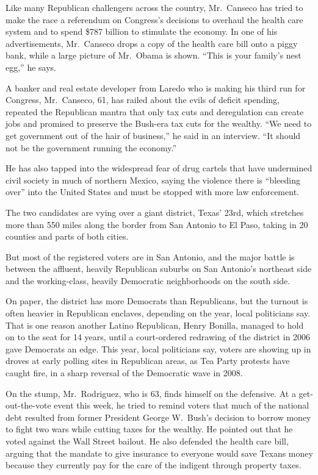 ﻿\documentclass[12pt]{article}
\begin{document}
Like many Republican challengers across the country, Mr.~Canseco has tried to make the race a
referendum on Congress's decisions to overhaul the health care system and to spend \$787 billion to
stimulate the economy. In one of his advertisements, Mr.~Canseco drops a copy of the health care
bill onto a piggy bank, while a large picture of Mr.~Obama is shown. ``This is your family's nest
egg,'' he says.

A banker and real estate developer from Laredo who is making his third run for Congress,
Mr.~Canseco, 61, has railed about the evils of deficit spending, repeated the Republican mantra that
only tax cuts and deregulation can create jobs and promised to preserve the Bush-era tax cuts for
the wealthy. ``We need to get government out of the hair of business,'' he said in an interview.
``It should not be the government running the economy.''

He has also tapped into the widespread fear of drug cartels that have undermined civil society in
much of northern Mexico, saying the violence there is ``bleeding over'' into the United States and
must be stopped with more law enforcement.

The two candidates are vying over a giant district, Texas' 23rd, which stretches more than 550 miles
along the border from San Antonio to El Paso, taking in 20 counties and parts of both cities.

But most of the registered voters are in San Antonio, and the major battle is between the affluent,
heavily Republican suburbs on San Antonio's northeast side and the working-class, heavily Democratic
neighborhoods on the south side.

On paper, the district has more Democrats than Republicans, but the turnout is often heavier in
Republican enclaves, depending on the year, local politicians say. That is one reason another Latino
Republican, Henry Bonilla, managed to hold on to the seat for 14 years, until a court-ordered
redrawing of the district in 2006 gave Democrats an edge. This year, local politicians say, voters
are showing up in droves at early polling sites in Republican areas, as Tea Party protests have
caught fire, in a sharp reversal of the Democratic wave in 2008.

On the stump, Mr.~Rodriguez, who is 63, finds himself on the defensive. At a get-out-the-vote event
this week, he tried to remind voters that much of the national debt resulted from former President
George W.~Bush's decision to borrow money to fight two wars while cutting taxes for the wealthy. He
pointed out that he voted against the Wall Street bailout. He also defended the health care bill,
arguing that the mandate to give insurance to everyone would save Texans money because they
currently pay for the care of the indigent through property taxes.
\end{document}
